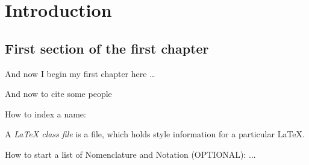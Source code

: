 
\chapter{Introduction}   %

\ifpdf
    \graphicspath{{Chapter1/Figs/Raster/}{Chapter1/Figs/PDF/}{Chapter1/Figs/}}
\else
    \graphicspath{{Chapter1/Figs/Vector/}{Chapter1/Figs/}}
\fi


\section{First section of the first chapter}

And now I begin my first chapter here \dots

And now to cite some people~\citet{Rea85,Ancey1996}

How to index a name:

A {\em \LaTeX{} class file} is a file, which holds style information for a particular \LaTeX{}.

How to start a list of Nomenclature and Notation (OPTIONAL): ...


\nomenclature[g-p]{$\pi$}{ $\simeq 3.14\ldots$}                                             %


